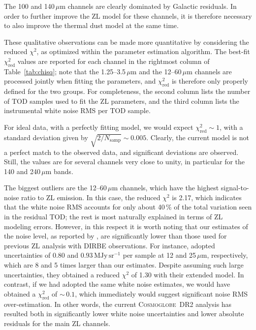 \documentclass[twocolumn]{aa}
\newcommand{\cosmoglobe}{\textsc{Cosmoglobe}}
\begin{document}
The 100 and 140$\,\mu$m channels are clearly dominated by Galactic
residuals. In order to further improve the ZL model for these channels, it is therefore necessary to also improve the thermal dust model at the same time.  

These qualitative observations can be made more quantitative by
considering the reduced $\chi^2$, as optimized within the parameter
estimation algorithm. The best-fit $\chi^2_{\mathrm{red}}$ values are
reported for each channel in the rightmost column of
Table~\ref{tab:chisq}; note that the 1.25--3.5$\,\mu$m and the 12--60$\,\mu$m channels are
processed jointly when fitting the parameters, and
$\chi^2_{\mathrm{red}}$ is therefore only properly defined for the two groups. 
For completeness, the second column lists the number of
TOD samples used to fit the ZL parameters, and the third column lists
the instrumental white noise RMS per TOD sample.

For ideal data, with a perfectly fitting model, we would
expect $\chi^2_{\mathrm{red}}\sim 1$, with a standard deviation given
by $\sqrt{2/N_{\mathrm{samp}}}\sim0.005$. Clearly, the current model
is not a perfect match to the observed data, and significant
deviations are observed. Still, the values are for several channels
very close to unity, in particular for the 140 and 240$\,\mu$m bands.

The biggest outliers are  the 12--60$\,\mu$m channels, which
have the highest signal-to-noise ratio to ZL emission. In this case,
the reduced $\chi^2$ is 2.17, which indicates that the white noise RMS
accounts for only about 40\,\% of the total variation seen in the residual
TOD; the rest is most naturally explained in terms of ZL modeling
errors. However, in this respect it is worth noting that our estimates
of the noise level, as reported by \citet{CG02_01}, are
significantly lower than those used for previous ZL analysis with
DIRBE observations. For instance, \citet{Robinson2013} adopted
uncertainties of 0.80 and $0.93\,\mathrm{MJy\,sr^{-1}}$ per sample at 12 and
25$\,\mu$m, respectively, which are 8 and 5 times larger than our
estimates. Despite assuming such large uncertainties, they obtained a
reduced $\chi^2$ of 1.30 with their extended model. In contrast, if we
had adopted the same white noise estimates, we would have obtained a
$\chi_\mathrm{red}^2$ of $\sim$\,$0.1$, which immediately would suggest
significant noise RMS over-estimation. In other words, the current
\cosmoglobe\ DR2 analysis has resulted both in significantly lower
white noise uncertainties and lower absolute residuals for the main ZL
channels.
\end{document}
